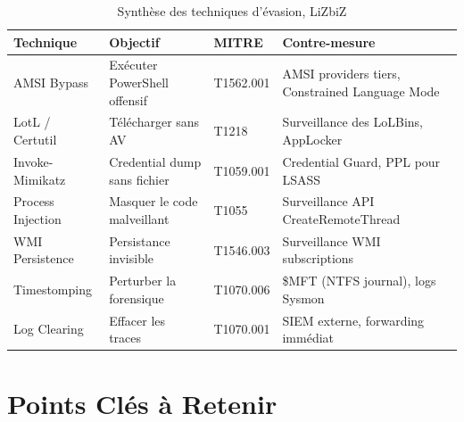 \begin{table}[htbp]
\centering
\caption{Synthèse des techniques d'évasion, LiZbiZ}
\label{tab:synthese_evasion}
\begin{tabular}{p{3cm}p{3.5cm}p{3cm}p{4cm}}
\toprule
\textbf{Technique} & \textbf{Objectif} & \textbf{MITRE} & \textbf{Contre-mesure} \\
\midrule
AMSI Bypass
    & Exécuter PowerShell offensif
    & T1562.001
    & AMSI providers tiers, Constrained Language Mode \\
\addlinespace
LotL / Certutil
    & Télécharger sans AV
    & T1218
    & Surveillance des LoLBins, AppLocker \\
\addlinespace
Invoke-Mimikatz
    & Credential dump sans fichier
    & T1059.001
    & Credential Guard, PPL pour LSASS \\
\addlinespace
Process Injection
    & Masquer le code malveillant
    & T1055
    & Surveillance API CreateRemoteThread \\
\addlinespace
WMI Persistence
    & Persistance invisible
    & T1546.003
    & Surveillance WMI subscriptions \\
\addlinespace
Timestomping
    & Perturber la forensique
    & T1070.006
    & \$MFT (NTFS journal), logs Sysmon \\
\addlinespace
Log Clearing
    & Effacer les traces
    & T1070.001
    & SIEM externe, forwarding immédiat \\
\bottomrule
\end{tabular}
\end{table}

\section*{Points Clés à Retenir}


